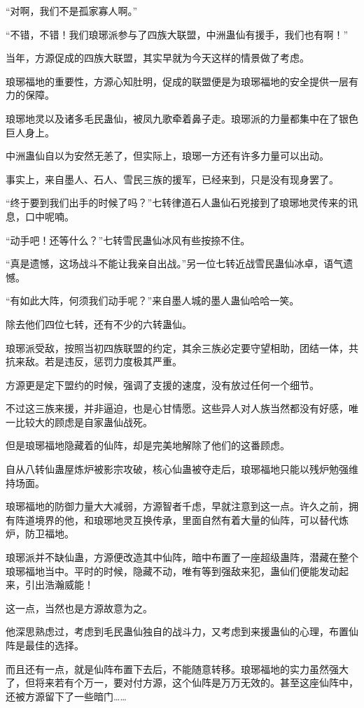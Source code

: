 \begin{this_body}
“对啊，我们不是孤家寡人啊。”

“不错，不错！我们琅琊派参与了四族大联盟，中洲蛊仙有援手，我们也有啊！”

当年，方源促成的四族大联盟，其实早就为今天这样的情景做了考虑。

琅琊福地的重要性，方源心知肚明，促成的联盟便是为琅琊福地的安全提供一层有力的保障。

琅琊地灵以及诸多毛民蛊仙，被凤九歌牵着鼻子走。琅琊派的力量都集中在了银色巨人身上。

中洲蛊仙自以为安然无恙了，但实际上，琅琊一方还有许多力量可以出动。

事实上，来自墨人、石人、雪民三族的援军，已经来到，只是没有现身罢了。

“终于要到我们出手的时候了吗？”七转律道石人蛊仙石兇接到了琅琊地灵传来的讯息，口中呢喃。

“动手吧！还等什么？”七转雪民蛊仙冰风有些按捺不住。

“真是遗憾，这场战斗不能让我亲自出战。”另一位七转近战雪民蛊仙冰卓，语气遗憾。

“有如此大阵，何须我们动手呢？”来自墨人城的墨人蛊仙哈哈一笑。

除去他们四位七转，还有不少的六转蛊仙。

琅琊派受敌，按照当初四族联盟的约定，其余三族必定要守望相助，团结一体，共抗来敌。若是违反，惩罚力度极其严重。

方源更是定下盟约的时候，强调了支援的速度，没有放过任何一个细节。

不过这三族来援，并非逼迫，也是心甘情愿。这些异人对人族当然都没有好感，唯一比较大的顾虑是自家蛊仙战死。

但是琅琊福地隐藏着的仙阵，却是完美地解除了他们的这番顾虑。

自从八转仙蛊屋炼炉被影宗攻破，核心仙蛊被夺走后，琅琊福地只能以残炉勉强维持场面。

琅琊福地的防御力量大大减弱，方源智者千虑，早就注意到这一点。许久之前，拥有阵道境界的他，和琅琊地灵互换传承，里面自然有着大量的仙阵，可以替代炼炉，防卫福地。

琅琊派并不缺仙蛊，方源便改造其中仙阵，暗中布置了一座超级蛊阵，潜藏在整个琅琊福地当中。平时的时候，隐藏不动，唯有等到强敌来犯，蛊仙们便能发动起来，引出浩瀚威能！

这一点，当然也是方源故意为之。

他深思熟虑过，考虑到毛民蛊仙独自的战斗力，又考虑到来援蛊仙的心理，布置仙阵是最佳的选择。

而且还有一点，就是仙阵布置下去后，不能随意转移。琅琊福地的实力虽然强大了，但将来若有个万一，要对付方源，这个仙阵是万万无效的。甚至这座仙阵中，还被方源留下了一些暗门……


\end{this_body}
